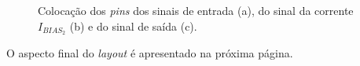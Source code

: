 \documentclass[11pt]{article}
\numberwithin{equation}{section}
\begin{document}
\begin{figure}[H]
	\centering
	\hspace{8mm}
	\hspace{8mm}
	\vspace{-0.8em}
	\caption{Colocação dos \textit{pins} dos sinais de entrada (a), do sinal da corrente $I_{BIAS_{2}}$ (b) e do sinal de saída (c).}
	\vspace{-0.8em}
\end{figure}

O aspecto final do \textit{layout} é apresentado na próxima página.

\pagebreak
\end{document}
